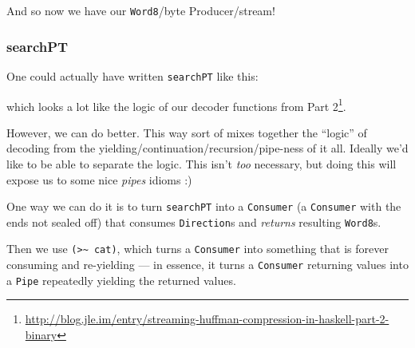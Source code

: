 \documentclass[]{article}
\newenvironment{Shaded}{}{}
\newcommand{\DataTypeTok}[1]{\textcolor[rgb]{0.56,0.13,0.00}{#1}}
\newcommand{\KeywordTok}[1]{\textcolor[rgb]{0.00,0.44,0.13}{\textbf{#1}}}
\newcommand{\NormalTok}[1]{#1}
\newcommand{\OperatorTok}[1]{\textcolor[rgb]{0.40,0.40,0.40}{#1}}
\newcommand{\OtherTok}[1]{\textcolor[rgb]{0.00,0.44,0.13}{#1}}
\renewcommand{\href}[2]{#2\footnote{\url{#1}}}
\begin{document}
And so now we have our \texttt{Word8}/byte Producer/stream!

\subsubsection{searchPT}\label{searchpt}

One could actually have written \texttt{searchPT} like this:

\begin{Shaded}
\end{Shaded}

which looks a lot like the logic of our decoder functions from
\href{http://blog.jle.im/entry/streaming-huffman-compression-in-haskell-part-2-binary}{Part
2}.

However, we can do better. This way sort of mixes together the ``logic'' of
decoding from the yielding/continuation/recursion/pipe-ness of it all. Ideally
we'd like to be able to separate the logic. This isn't \emph{too} necessary, but
doing this will expose us to some nice \emph{pipes} idioms :)

One way we can do it is to turn \texttt{searchPT} into a
\texttt{Consumer\textquotesingle{}} (a \texttt{Consumer} with the ends not
sealed off) that consumes \texttt{Direction}s and \emph{returns} resulting
\texttt{Word8}s.

Then we use \texttt{(\textgreater{}\textasciitilde{}\ cat)}, which turns a
\texttt{Consumer\textquotesingle{}} into something that is forever consuming and
re-yielding --- in essence, it turns a \texttt{Consumer\textquotesingle{}}
returning values into a \texttt{Pipe} repeatedly yielding the returned values.
\end{document}
